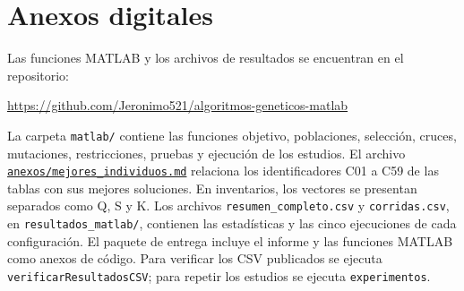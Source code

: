 \documentclass[conference]{IEEEtran}
\begin{document}
\section*{Anexos digitales}
Las funciones MATLAB y los archivos de resultados se encuentran en el repositorio:
\begin{center}
\url{https://github.com/Jeronimo521/algoritmos-geneticos-matlab}
\end{center}
La carpeta \texttt{matlab/} contiene las funciones objetivo, poblaciones, selección, cruces, mutaciones, restricciones, pruebas y ejecución de los estudios. El archivo \href{https://github.com/Jeronimo521/algoritmos-geneticos-matlab/blob/main/anexos/mejores_individuos.md}{\texttt{anexos/mejores\_individuos.md}} relaciona los identificadores C01 a C59 de las tablas con sus mejores soluciones. En inventarios, los vectores se presentan separados como Q, S y K. Los archivos \texttt{resumen\_completo.csv} y \texttt{corridas.csv}, en \texttt{resultados\_matlab/}, contienen las estadísticas y las cinco ejecuciones de cada configuración. El paquete de entrega incluye el informe y las funciones MATLAB como anexos de código. Para verificar los CSV publicados se ejecuta \texttt{verificarResultadosCSV}; para repetir los estudios se ejecuta \texttt{experimentos}.
\end{document}
